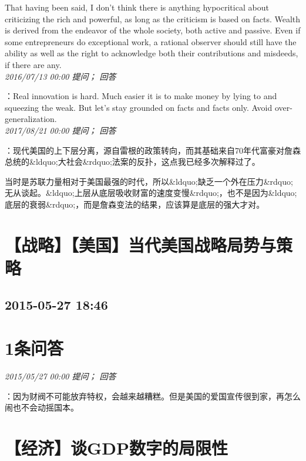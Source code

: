 \documentclass[twocolumn]{ctexart}
\begin{document}
That having been said, I don't think there is anything hypocritical about criticizing the rich and powerful, as long as the criticism is based on facts. Wealth is derived from the endeavor of the whole society, both active and passive. Even if some entrepreneurs do exceptional work, a rational observer should still have the ability as well as the right to acknowledge both their contributions and misdeeds, if there are any.\\

\textit{\hfill\noindent\small 2016/07/13 00:00 提问； 回答}

：Real innovation is hard. Much easier it is to make money by lying to and squeezing the weak. But let's stay grounded on facts and facts only. Avoid over-generalization.\\

\textit{\hfill\noindent\small 2017/08/21 00:00 提问； 回答}

：现代美国的上下层分离，源自雷根的政策转向，而其基础来自70年代富豪对詹森总统的\&ldquo;大社会\&rdquo;法案的反扑，这点我已经多次解释过了。

当时是苏联力量相对于美国最强的时代，所以\&ldquo;缺乏一个外在压力\&rdquo;无从谈起。\&ldquo;上层从底层吸收财富的速度变慢\&rdquo;，也不是因为\&ldquo;底层的衰弱\&rdquo;，而是詹森变法的结果，应该算是底层的强大才对。\\


\section{【战略】【美国】当代美国战略局势与策略}
\subsection{2015-05-27 18:46}


\section{1条问答}

\textit{\hfill\noindent\small 2015/05/27 00:00 提问； 回答}

：因为财阀不可能放弃特权，会越来越糟糕。但是美国的爱国宣传很到家，再怎么闹也不会动摇国本。\\


\section{【经济】谈GDP数字的局限性 }
\end{document}
